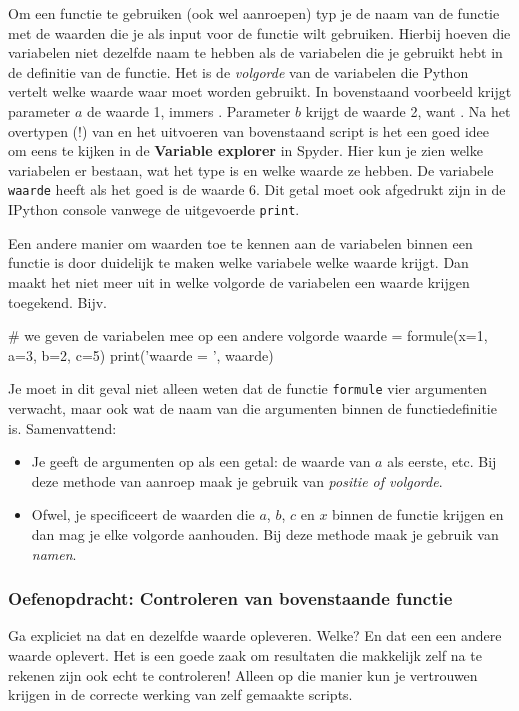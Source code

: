 \documentclass[a4paper,11pt, fleqn]{article}
\begin{document}
Om een functie te gebruiken (ook wel aanroepen) typ je de naam van de functie met de waarden die je als input voor de functie wilt gebruiken. Hierbij hoeven die variabelen niet dezelfde naam te hebben als de variabelen die je gebruikt hebt in de definitie van de functie. Het is de \textit{volgorde} van de variabelen die Python vertelt welke waarde waar moet worden gebruikt. 
In bovenstaand voorbeeld krijgt parameter $a$ de waarde 1, immers . Parameter $b$ krijgt de waarde 2, want . 
Na het overtypen (!) van en het uitvoeren van bovenstaand script is het een goed idee om eens te kijken in de \textbf{Variable explorer} in Spyder. Hier kun je zien welke variabelen er bestaan, wat het type is en welke waarde ze hebben. De variabele \verb, waarde, heeft als het goed is de waarde 6. Dit getal moet ook afgedrukt zijn in de IPython console vanwege de uitgevoerde \verb,print,.

Een andere manier om waarden toe te kennen aan de variabelen binnen een functie is door duidelijk te maken welke variabele welke waarde krijgt. Dan maakt het niet meer uit in welke volgorde de variabelen een waarde krijgen toegekend. Bijv.

\begin{python}
# we geven de variabelen mee op een andere volgorde
waarde = formule(x=1, a=3, b=2, c=5) 
print('waarde = ', waarde)
\end{python}

Je moet in dit geval niet alleen weten dat de functie \verb,formule, vier argumenten verwacht, maar ook wat de naam van die argumenten binnen de functiedefinitie is. Samenvattend:
\begin{itemize}
\item Je geeft de argumenten op als een getal: de waarde van $a$ als eerste, etc.
Bij deze methode van aanroep maak je gebruik van \textit{positie of volgorde}.

\item Ofwel, je specificeert de waarden die $a$, $b$, $c$ en $x$ binnen de functie krijgen en dan mag je elke volgorde aanhouden. Bij deze methode maak je gebruik van \textit{namen}.
\end{itemize}

\subsubsection*{Oefenopdracht: Controleren van bovenstaande functie}
Ga expliciet na dat  en   dezelfde waarde opleveren. Welke? En dat een  een andere waarde oplevert. Het is een goede zaak om resultaten die makkelijk zelf na te rekenen zijn ook echt te controleren! Alleen op die manier kun je vertrouwen krijgen in de correcte werking van zelf gemaakte scripts.  
\end{document}
